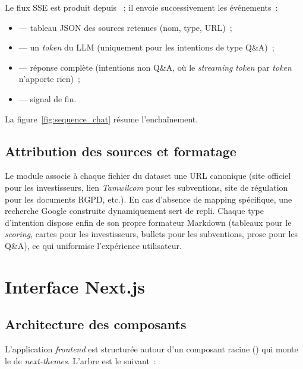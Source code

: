 Le flux \ac{SSE} est produit depuis ~; il envoie successivement les événements~:

\begin{itemize}
  \item {} --- tableau \ac{JSON} des sources retenues (nom, type, URL)~;
  \item {} --- un \textit{token} du \ac{LLM} (uniquement pour les intentions de type Q\&A)~;
  \item {} --- réponse complète (intentions non Q\&A, où le \textit{streaming} \textit{token} par \textit{token} n'apporte rien)~;
  \item {} --- signal de fin.
\end{itemize}

La figure~\ref{fig:sequence_chat} résume l'enchaînement.



\subsection{Attribution des sources et formatage}

Le module  associe à chaque fichier du dataset une \ac{URL} canonique (site officiel pour les investisseurs, lien \textit{Tamwilcom} pour les subventions, site de régulation pour les documents \ac{RGPD}, etc.). En cas d'absence de mapping spécifique, une recherche Google construite dynamiquement sert de repli. Chaque type d'intention dispose enfin de son propre formateur Markdown (tableaux pour le \textit{scoring}, cartes pour les investisseurs, bullets pour les subventions, prose pour les Q\&A), ce qui uniformise l'expérience utilisateur.

\section{Interface Next.js}

\subsection{Architecture des composants}

L'application \textit{frontend} est structurée autour d'un composant racine () qui monte le  de \textit{next-themes}. L'arbre est le suivant~:

